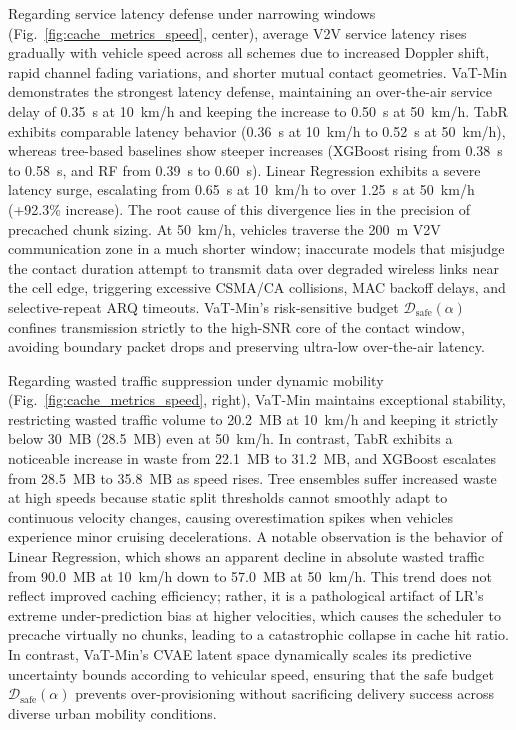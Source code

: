 \documentclass[journal]{IEEEtran}
\begin{document}
Regarding service latency defense under narrowing windows (Fig.~\ref{fig:cache_metrics_speed}, center), average V2V service latency rises gradually with vehicle speed across all schemes due to increased Doppler shift, rapid channel fading variations, and shorter mutual contact geometries. VaT-Min demonstrates the strongest latency defense, maintaining an over-the-air service delay of 0.35~s at 10~km/h and keeping the increase to 0.50~s at 50~km/h. TabR exhibits comparable latency behavior (0.36~s at 10~km/h to 0.52~s at 50~km/h), whereas tree-based baselines show steeper increases (XGBoost rising from 0.38~s to 0.58~s, and RF from 0.39~s to 0.60~s). Linear Regression exhibits a severe latency surge, escalating from 0.65~s at 10~km/h to over 1.25~s at 50~km/h (+92.3\% increase). The root cause of this divergence lies in the precision of precached chunk sizing. At 50~km/h, vehicles traverse the 200~m V2V communication zone in a much shorter window; inaccurate models that misjudge the contact duration attempt to transmit data over degraded wireless links near the cell edge, triggering excessive CSMA/CA collisions, MAC backoff delays, and selective-repeat ARQ timeouts. VaT-Min's risk-sensitive budget $\mathcal{D}_{\text{safe}}(\alpha)$ confines transmission strictly to the high-SNR core of the contact window, avoiding boundary packet drops and preserving ultra-low over-the-air latency.

Regarding wasted traffic suppression under dynamic mobility (Fig.~\ref{fig:cache_metrics_speed}, right), VaT-Min maintains exceptional stability, restricting wasted traffic volume to 20.2~MB at 10~km/h and keeping it strictly below 30~MB (28.5~MB) even at 50~km/h. In contrast, TabR exhibits a noticeable increase in waste from 22.1~MB to 31.2~MB, and XGBoost escalates from 28.5~MB to 35.8~MB as speed rises. Tree ensembles suffer increased waste at high speeds because static split thresholds cannot smoothly adapt to continuous velocity changes, causing overestimation spikes when vehicles experience minor cruising decelerations. A notable observation is the behavior of Linear Regression, which shows an apparent decline in absolute wasted traffic from 90.0~MB at 10~km/h down to 57.0~MB at 50~km/h. This trend does not reflect improved caching efficiency; rather, it is a pathological artifact of LR's extreme under-prediction bias at higher velocities, which causes the scheduler to precache virtually no chunks, leading to a catastrophic collapse in cache hit ratio. In contrast, VaT-Min's CVAE latent space dynamically scales its predictive uncertainty bounds according to vehicular speed, ensuring that the safe budget $\mathcal{D}_{\text{safe}}(\alpha)$ prevents over-provisioning without sacrificing delivery success across diverse urban mobility conditions.
\end{document}

